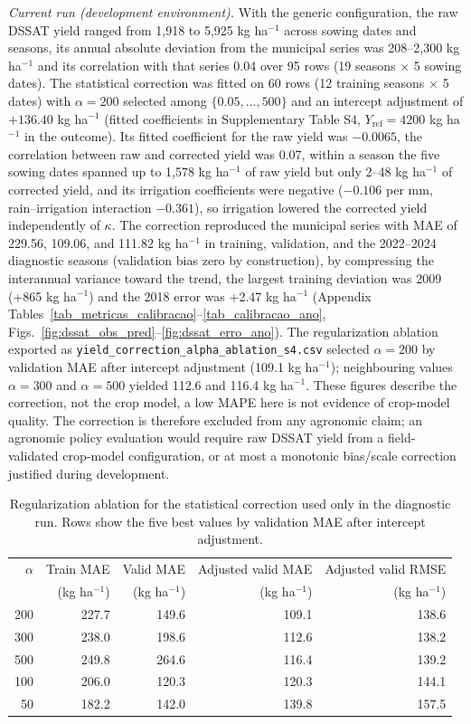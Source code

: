 \documentclass[times,final,authoryear]{elsarticle}
\begin{document}
\emph{Current run (development environment).} With the generic configuration, the raw DSSAT yield ranged from 1,918 to 5,925 kg ha$^{-1}$ across sowing dates and seasons, its annual absolute deviation from the municipal series was 208--2,300 kg ha$^{-1}$ and its correlation with that series 0.04 over 95 rows (19 seasons $\times$ 5 sowing dates). The statistical correction was fitted on 60 rows (12 training seasons $\times$ 5 dates) with $\alpha = 200$ selected among $\{0.05,\dots,500\}$ and an intercept adjustment of $+136.40$ kg ha$^{-1}$ (fitted coefficients in Supplementary Table S4, $Y_{\text{ref}} = 4200$ kg ha$^{-1}$ in the outcome). Its fitted coefficient for the raw yield was $-0.0065$, the correlation between raw and corrected yield was 0.07, within a season the five sowing dates spanned up to 1,578 kg ha$^{-1}$ of raw yield but only 2--48 kg ha$^{-1}$ of corrected yield, and its irrigation coefficients were negative ($-0.106$ per mm, rain--irrigation interaction $-0.361$), so irrigation lowered the corrected yield independently of $\kappa$. The correction reproduced the municipal series with MAE of 229.56, 109.06, and 111.82 kg ha$^{-1}$ in training, validation, and the 2022--2024 diagnostic seasons (validation bias zero by construction), by compressing the interannual variance toward the trend, the largest training deviation was 2009 (+865 kg ha$^{-1}$) and the 2018 error was +2.47 kg ha$^{-1}$ (Appendix Tables~\ref{tab_metricas_calibracao}--\ref{tab_calibracao_ano}, Figs.~\ref{fig:dssat_obs_pred}--\ref{fig:dssat_erro_ano}). The regularization ablation exported as \texttt{yield\_correction\_alpha\_ablation\_s4.csv} selected $\alpha=200$ by validation MAE after intercept adjustment (109.1 kg ha$^{-1}$); neighbouring values $\alpha=300$ and $\alpha=500$ yielded 112.6 and 116.4 kg ha$^{-1}$. These figures describe the correction, not the crop model, a low MAPE here is not evidence of crop-model quality. The correction is therefore excluded from any agronomic claim; an agronomic policy evaluation would require raw DSSAT yield from a field-validated crop-model configuration, or at most a monotonic bias/scale correction justified during development.

\begin{table}[!h]
\centering
\scriptsize
\caption{Regularization ablation for the statistical correction used only in the diagnostic run. Rows show the five best values by validation MAE after intercept adjustment.}
\label{tab_alpha_ablation}
\begin{tabular}{rrrrr}
\hline
$\alpha$ & Train MAE & Valid MAE & Adjusted valid MAE & Adjusted valid RMSE \\
         & (kg ha$^{-1}$) & (kg ha$^{-1}$) & (kg ha$^{-1}$) & (kg ha$^{-1}$) \\
\hline
200 & 227.7 & 149.6 & 109.1 & 138.6 \\
300 & 238.0 & 198.6 & 112.6 & 138.2 \\
500 & 249.8 & 264.6 & 116.4 & 139.2 \\
100 & 206.0 & 120.3 & 120.3 & 144.1 \\
50  & 182.2 & 142.0 & 139.8 & 157.5 \\
\hline
\end{tabular}
\end{table}
\end{document}

